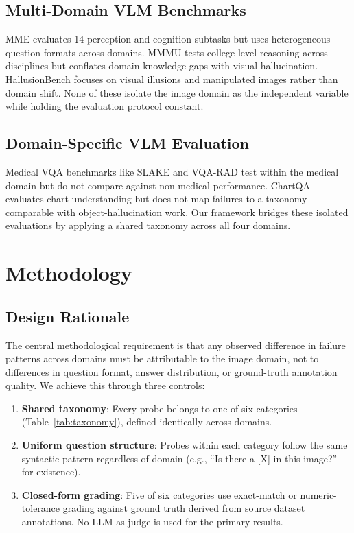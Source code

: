 \documentclass[conference]{IEEEtran}
\begin{document}
\subsection{Multi-Domain VLM Benchmarks}

MME \cite{fu2023mme} evaluates 14 perception and cognition subtasks but uses heterogeneous question formats across domains. MMMU \cite{yue2023mmmu} tests college-level reasoning across disciplines but conflates domain knowledge gaps with visual hallucination. HallusionBench \cite{liu2023hallusionbench} focuses on visual illusions and manipulated images rather than domain shift. None of these isolate the image domain as the independent variable while holding the evaluation protocol constant.

\subsection{Domain-Specific VLM Evaluation}

Medical VQA benchmarks like SLAKE \cite{liu2021slake} and VQA-RAD \cite{lau2018vqarad} test within the medical domain but do not compare against non-medical performance. ChartQA \cite{masry2022chartqa} evaluates chart understanding but does not map failures to a taxonomy comparable with object-hallucination work. Our framework bridges these isolated evaluations by applying a shared taxonomy across all four domains.

\section{Methodology}

\subsection{Design Rationale}

The central methodological requirement is that any observed difference in failure patterns across domains must be attributable to the image domain, not to differences in question format, answer distribution, or ground-truth annotation quality. We achieve this through three controls:

\begin{enumerate}
\item \textbf{Shared taxonomy}: Every probe belongs to one of six categories (Table~\ref{tab:taxonomy}), defined identically across domains.
\item \textbf{Uniform question structure}: Probes within each category follow the same syntactic pattern regardless of domain (e.g., ``Is there a [X] in this image?'' for existence).
\item \textbf{Closed-form grading}: Five of six categories use exact-match or numeric-tolerance grading against ground truth derived from source dataset annotations. No LLM-as-judge is used for the primary results.
\end{enumerate}
\end{document}
